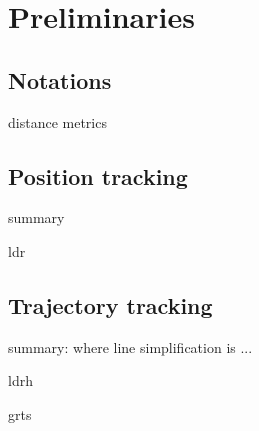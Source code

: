 



\section{Preliminaries}
\label{sec-pre}

\subsection{Notations}
distance metrics

\subsection{Position tracking}
summary

ldr

\subsection{Trajectory tracking}
summary: 
where line simplification is ...

ldrh

grts




